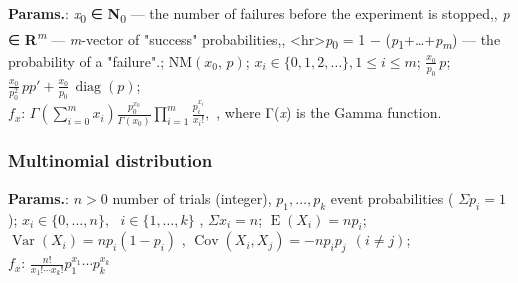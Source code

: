     {\color{darkblue} \textbf{Params.}:} {\textit{x}\textsubscript{0} ∈ \textbf{N}\textsubscript{0} — the number of failures before the experiment is stopped,, \textit{p} ∈ \textbf{R}\textsuperscript{\textit{m}} — \textit{m}-vector of "success" probabilities,, <hr>\textit{p}\textsubscript{0} = 1 − (\textit{p}\textsubscript{1}+…+\textit{p}\textsubscript{\textit{m}}) — the probability of a "failure".}; {$\textrm{NM}(x_0,\,p)$}; {$x_i \in \{0,1,2,\ldots\}, 1\leq i\leq m$}; {$ \tfrac{x_0}{p_0}\,p $}; {$ \tfrac{x_0}{p_0^2}\,pp' + \tfrac{x_0}{p_0}\,\operatorname{diag}(p) $};\hspace{0.5cm}\\{\color{darkblue} \textbf{$f_x$}:} {$\Gamma\!\left(\sum_{i=0}^m{x_i}\right)\frac{p_0^{x_0}}{\Gamma(x_0)} \prod_{i=1}^m{\frac{p_i^{x_i}}{x_i!}},$ ,  where Γ(\textit{x}) is the Gamma function.}



    
        
\subsubsection{Multinomial distribution}





    {\color{darkblue} \textbf{Params.}:} {$n > 0$ number of trials (integer),  $p_1, \ldots, p_k$ event probabilities ( $\Sigma p_i = 1$ )}; {$x_i \in \{0, \dots, n\}, \,\,\,\,i \in \{1,\dots,k\}$ ,  $\Sigma x_i = n\!$}; {$\operatorname E(X_i) = np_i$}; {$\operatorname{Var}(X_i) = n p_i (1-p_i)$ ,  $\operatorname{Cov}(X_i,X_j) = - n p_i p_j~~(i\neq j)$};\hspace{0.5cm}\\{\color{darkblue} \textbf{$f_x$}:} {$\frac{n!}{x_1!\cdots x_k!} p_1^{x_1} \cdots p_k^{x_k}$}



